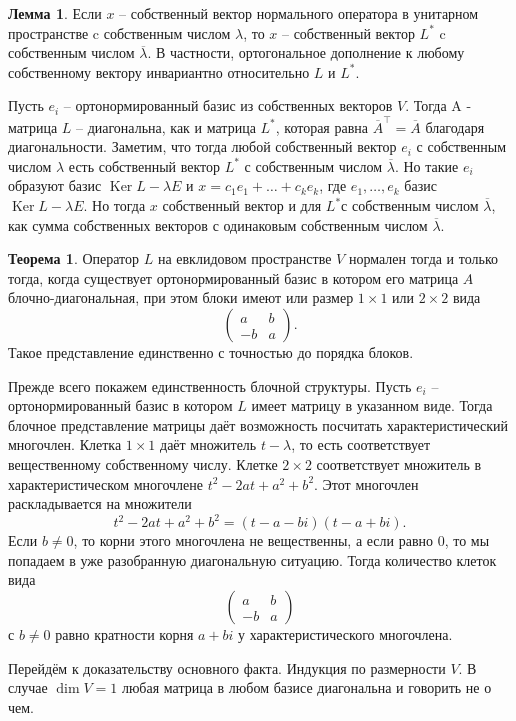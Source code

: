 \documentclass[10pt,a4paper,oneside]{book} %
\theoremstyle{definition}
\newtheorem{thm}{Теорема}
\newtheorem{lem}{Лемма}
\newcommand{\ovl}{\overline}
\DeclareMathOperator{\Ker}{Ker}
\def\thrm{\begin{thm}}
\def\ethrm{\end{thm}}
\def\lm{\begin{lem}}
\def\elm{\end{lem}}
\begin{document}
\lm Если $x$ -- собственный вектор нормального оператора в унитарном пространстве c собственным числом $\lambda$, то $x$ -- собственный вектор $L^*$ c собственным числом $\ovl{\lambda}$. В частности, ортогональное дополнение к любому собственному вектору инвариантно относительно $L$ и $L^*$.
\elm
\proof Пусть $e_i$ -- ортонормированный базис из собственных векторов $V$. Тогда A - матрица $L$ -- диагональна, как и матрица $L^*$, которая равна $\ovl{A}^{\top}= \ovl{A}$ благодаря диагональности. Заметим, что тогда любой собственный вектор $e_i$ с собственным числом $\lambda$ есть собственный вектор $L^*$ с собственным числом $\ovl{\lambda}$.
Но такие $e_i$ образуют базис $\Ker L- \lambda E$ и
$x=c_1 e_1+\dots +c_k e_k$, где $e_1,\dots, e_k$ базис $\Ker L- \lambda E$. Но тогда $x$ собственный вектор и для $L^*$с собственным числом $\ovl{\lambda}$, как сумма собственных векторов с одинаковым собственным числом $\ovl{\lambda}$.
\endproof


\thrm
Оператор $L$ на евклидовом пространстве $V$ нормален  тогда и только тогда, когда существует ортонормированный базис в котором его матрица $A$ блочно-диагональная, при этом блоки имеют  или размер $1\times 1$ или $2\times 2$ вида
$$\begin{pmatrix}
a  & b\\
-b & a
\end{pmatrix}.$$
Такое представление единственно с точностью до порядка блоков.
\ethrm
\proof
Прежде всего покажем единственность блочной структуры. Пусть $e_i$ -- ортонормированный базис в котором $L$ имеет матрицу в указанном виде. Тогда блочное представление матрицы даёт возможность посчитать характеристический многочлен. Клетка $1\times 1$ даёт множитель $t-\lambda$, то есть соответствует вещественному собственному числу. Клетке $2\times 2$ соответствует множитель в характеристическом многочлене $t^2-2at+a^2+b^2$. Этот многочлен раскладывается на множители $$t^2-2at+a^2+b^2= (t-a-bi)(t-a+bi).$$
Если $b\neq 0$, то корни этого многочлена не вещественны, а если равно 0, то мы попадаем в уже разобранную диагональную ситуацию. Тогда количество клеток вида 
$$\begin{pmatrix}
a  & b\\
-b & a
\end{pmatrix}$$
с $b\neq 0$ равно кратности корня $a+bi$ у характеристического многочлена.



Перейдём к доказательству основного факта. Индукция по размерности $V$. В случае $\dim V=1$ любая матрица в любом базисе диагональна и говорить не о чем. 
\end{document}
